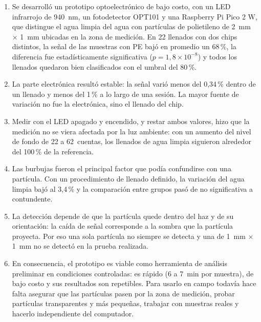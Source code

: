 \begin{enumerate}
  \item Se desarrolló un prototipo optoelectrónico de bajo costo, con un LED infrarrojo de
    940~nm, un fotodetector OPT101 y una Raspberry Pi Pico 2 W, que distingue el agua
    limpia del agua con partículas de polietileno de 2~mm $\times$ 1~mm ubicadas en la zona de
    medición. En 22 llenados con dos chips distintos, la señal de las muestras con PE
    bajó en promedio un 68\,\%, la diferencia fue estadísticamente significativa
    ($p = 1{,}8 \times 10^{-8}$) y todos los llenados quedaron bien clasificados con el
    umbral del 80\,\%.
  \item La parte electrónica resultó estable: la señal varió menos del 0,34\,\% dentro de
    un llenado y menos del 1\,\% a lo largo de una sesión. La mayor fuente de variación no
    fue la electrónica, sino el llenado del chip.
  \item Medir con el LED apagado y encendido, y restar ambos valores, hizo que la medición
    no se viera afectada por la luz ambiente: con un aumento del nivel de fondo de 22 a
    62~cuentas, los llenados de agua limpia siguieron alrededor del 100\,\% de la
    referencia.
  \item Las burbujas fueron el principal factor que podía confundirse con una partícula.
    Con un procedimiento de llenado definido, la variación del agua limpia bajó al
    3,4\,\% y la comparación entre grupos pasó de no significativa a contundente.
  \item La detección depende de que la partícula quede dentro del haz y de su orientación:
    la caída de señal corresponde a la sombra que la partícula proyecta. Por eso una sola
    partícula no siempre se detecta y una de 1~mm $\times$ 1~mm no se detectó en la prueba
    realizada.
  \item En consecuencia, el prototipo es viable como herramienta de análisis preliminar
    en condiciones controladas: es rápido (6 a 7~min por muestra), de bajo costo y sus
    resultados son repetibles. Para usarlo en campo todavía hace falta asegurar que las
    partículas pasen por la zona de medición, probar partículas transparentes y más
    pequeñas, trabajar con muestras reales y hacerlo independiente del computador.
\end{enumerate}



